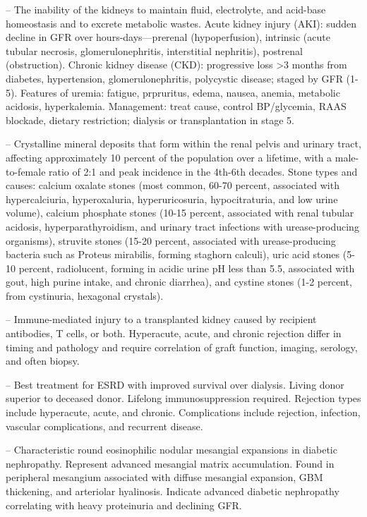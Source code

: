-- The inability of the kidneys to maintain fluid, electrolyte, and acid-base homeostasis and to excrete metabolic wastes. Acute kidney injury (AKI): sudden decline in GFR over hours-days—prerenal (hypoperfusion), intrinsic (acute tubular necrosis, glomerulonephritis, interstitial nephritis), postrenal (obstruction). Chronic kidney disease (CKD): progressive loss >3 months from diabetes, hypertension, glomerulonephritis, polycystic disease; staged by GFR (1-5). Features of uremia: fatigue, prpruritus, edema, nausea, anemia, metabolic acidosis, hyperkalemia. Management: treat cause, control BP/glycemia, RAAS blockade, dietary restriction; dialysis or transplantation in stage 5.

-- Crystalline mineral deposits that form within the renal pelvis and urinary tract, affecting approximately 10 percent of the population over a lifetime, with a male-to-female ratio of 2:1 and peak incidence in the 4th-6th decades. Stone types and causes: calcium oxalate stones (most common, 60-70 percent, associated with hypercalciuria, hyperoxaluria, hyperuricosuria, hypocitraturia, and low urine volume), calcium phosphate stones (10-15 percent, associated with renal tubular acidosis, hyperparathyroidism, and urinary tract infections with urease-producing organisms), struvite stones (15-20 percent, associated with urease-producing bacteria such as Proteus mirabilis, forming staghorn calculi), uric acid stones (5-10 percent, radiolucent, forming in acidic urine pH less than 5.5, associated with gout, high purine intake, and chronic diarrhea), and cystine stones (1-2 percent, from cystinuria, hexagonal crystals).

-- Immune-mediated injury to a transplanted kidney caused by recipient antibodies, T cells, or both. Hyperacute, acute, and chronic rejection differ in timing and pathology and require correlation of graft function, imaging, serology, and often biopsy.

-- Best treatment for ESRD with improved survival over dialysis. Living donor superior to deceased donor. Lifelong immunosuppression required. Rejection types include hyperacute, acute, and chronic. Complications include rejection, infection, vascular complications, and recurrent disease.

-- Characteristic round eosinophilic nodular mesangial expansions in diabetic nephropathy. Represent advanced mesangial matrix accumulation. Found in peripheral mesangium associated with diffuse mesangial expansion, GBM thickening, and arteriolar hyalinosis. Indicate advanced diabetic nephropathy correlating with heavy proteinuria and declining GFR.

